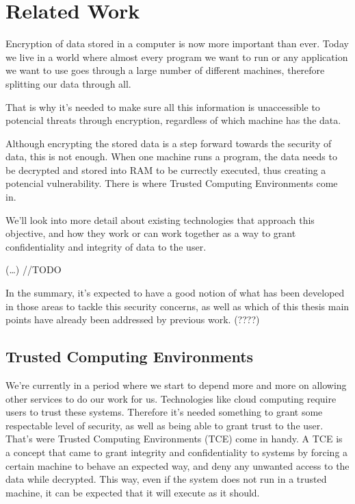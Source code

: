\chapter{Related Work}
\label{cha:users_manual}

Encryption of data stored in a computer is now more important than ever. Today we live in a world where almost every program we want to run or any application we want to use goes through a large number of different machines, therefore splitting our data through all. 

That is why it's needed to make sure all this information is unaccessible to potencial threats through encryption, regardless of which machine has the data. 

Although encrypting the stored data is a step forward towards the security of data, this is not enough. When one machine runs a program, the data needs to be decrypted and stored into RAM to be currectly executed, thus creating a potencial vulnerability. There is where Trusted Computing Environments come in.

We’ll look into more detail about existing technologies that approach this objective, and how they work or can work together as a way to grant confidentiality and integrity of data to the user.

(…) //TODO

In the summary, it’s expected to have a good notion of what has been developed in those areas to tackle this security concerns, as well as which of this thesis main points have already been addressed by previous work. (????)

\section{Trusted  Computing Environments} %
\label{sec:introduction}
We're currently in a period where we start to depend more and more on allowing other services to do our work for us. Technologies like cloud computing require users to trust these systems. Therefore it's needed something to grant some respectable level of security, as well as being able to grant trust to the user. That's were Trusted Computing Environments (TCE) come in handy.
A TCE is a concept that came to grant integrity and confidentiality to systems by forcing a certain machine to behave an expected way, and deny any unwanted access to the data while decrypted. This way, even if the system does not run in a trusted machine, it can be expected that it will execute as it should. 

